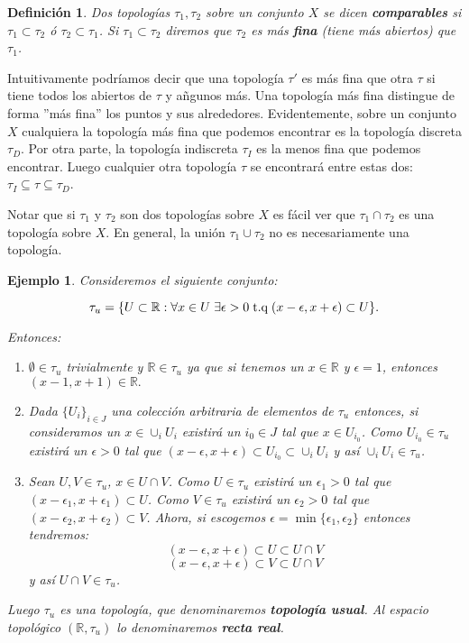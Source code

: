 \documentclass[12pt]{article}
\newtheorem{definition}[theorem]{Definición}
\newtheorem{example}{Ejemplo}[theorem]
\begin{document}
\begin{definition}Dos topologías $\tau_1, \tau_2$ sobre un conjunto $X$ se dicen \textbf{comparables} si $\tau_1 \subset \tau_2$ ó $\tau_2 \subset \tau_1$. Si $\tau_1 \subset \tau_2$ diremos que $\tau_2$ es más \textbf{fina} (tiene más abiertos) que $\tau_1$.
\end{definition}

Intuitivamente podríamos decir que una topología $\tau'$ es más fina que otra $\tau$ si tiene todos los abiertos de $\tau$ y añgunos más. Una topología más fina distingue de forma ''más fina'' los puntos y sus alrededores. Evidentemente, sobre un conjunto $X$ cualquiera la topología más fina que podemos encontrar es la topología discreta $\tau_D$. Por otra parte, la topología indiscreta $\tau_I$ es la menos fina que podemos encontrar. Luego cualquier otra topología $\tau$ se encontrará entre estas dos: $\tau_I \subseteq \tau \subseteq \tau_D$.

Notar que si $\tau_1$ y $\tau_2$ son dos topologías sobre $X$ es fácil ver que $\tau_1 \cap \tau_2$ es una topología sobre $X$. En general, la unión $\tau_1 \cup \tau_2$ no es necesariamente una topología.

\begin{example}\label{eq:topUsual} Consideremos el siguiente conjunto: 

$$\tau_u = \lbrace U \subset \mathbb{R}: \forall x \in U\hspace{0.1cm} \exists \epsilon > 0\hspace{0.1cm} \text{t.q}\hspace{0.1cm} (x-\epsilon, x+ \epsilon) \subset U \rbrace.$$

Entonces: 
\begin{enumerate}
\item $\emptyset \in \tau_u$ trivialmente y $\mathbb{R} \in \tau_u$ ya que si tenemos un $x \in \mathbb{R}$ y $\epsilon = 1$, entonces $(x-1, x+1) \in \mathbb{R}.$
\item Dada $\lbrace U_i \rbrace_{i\in J}$ una colección arbitraria de elementos de $\tau_u$ entonces,  si consideramos un $x \in \cup_i U_i$ existirá un $i_0 \in J$ tal que $x \in U_{i_0}$. Como $U_{i_0} \in \tau_u$ existirá un $\epsilon >0$ tal que $(x-\epsilon, x + \epsilon) \subset U_{i_0} \subset \cup_i U_i$ y así $\cup_i U_i \in \tau_u$.
\item Sean $U, V \in \tau_u$, $x \in U \cap V$. Como $U \in \tau_u$ existirá un $\epsilon_1>0$ tal que $(x-\epsilon_1, x+\epsilon_1) \subset U$. Como $V \in \tau_u$ existirá un $\epsilon_2 >0$ tal que $(x-\epsilon_2, x+\epsilon_2) \subset V$. Ahora, si escogemos $\epsilon = \min \lbrace \epsilon_1, \epsilon_2 \rbrace$ entonces tendremos: $$(x-\epsilon, x+\epsilon) \subset U \subset U \cap V$$ $$ (x-\epsilon, x+\epsilon) \subset V \subset U \cap V$$ y así $ U \cap V \in \tau_u$.
\end{enumerate}

Luego $\tau_u$ es una topología, que denominaremos \textbf{topología usual}. Al espacio topológico $(\mathbb{R}, \tau_u)$ lo denominaremos \textbf{recta real}.
\end{example}
\end{document}
